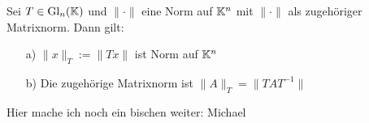 \begin{Lemma}
  Sei $T \in \mathrm{Gl}_n(\mathbb K)$ und $\| \cdot \|$ eine Norm auf $\mathbb K^n$ mit $\| \cdot \|$
  als zugehöriger Matrixnorm. Dann gilt:
\begin{enumerate}
  \item[a)] $\|x\|_T := \|T x\|$ ist Norm auf $\mathbb K^n$
  \item[b)] Die zugehörige Matrixnorm ist $\|A\|_T = \|T A T^{-1}\|$
\end{enumerate}
\end{Lemma}



Hier mache ich noch ein bischen weiter: Michael


